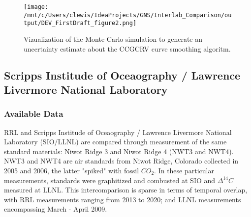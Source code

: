 \begin{figure}[h!]
  \texttt{[image: /mnt/c/Users/clewis/IdeaProjects/GNS/Interlab\_Comparison/output/DEV\_FirstDraft\_figure2.png]}
  \caption{Vizualization of the Monte Carlo simulation to generate an uncertainty estimate about the CCGCRV curve smoothing algoritm. }
  \label{fig:montecarloexplained}
\end{figure}

\subsection{Scripps Institude of Oceaography / Lawrence Livermore National Laboratory}
\subsubsection{Available Data}

RRL and Scripps Institude of Oceaography / Lawrence Livermore National Laboratory (SIO/LLNL) are compared through measurement of the same standard materials: Niwot Ridge 3 and Niwot Ridge 4 (NWT3 and NWT4). NWT3 and NWT4 are air standards from Niwot Ridge, Colorado collected in 2005 and 2006, the latter "spiked" with fossil ${CO_{2}}$. In these particular measurements, standards were graphitized and combusted at SIO and ${\Delta^{14}C}$ measured at LLNL. This intercomparison is sparse in terms of temporal overlap, with RRL measurements ranging from 2013 to 2020; and LLNL measurements encompassing March - April 2009. 












